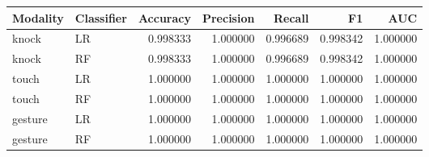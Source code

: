 \begin{tabular}{llrrrrr}
\toprule
Modality & Classifier & Accuracy & Precision & Recall & F1 & AUC \\
\midrule
knock & LR & 0.998333 & 1.000000 & 0.996689 & 0.998342 & 1.000000 \\
knock & RF & 0.998333 & 1.000000 & 0.996689 & 0.998342 & 1.000000 \\
touch & LR & 1.000000 & 1.000000 & 1.000000 & 1.000000 & 1.000000 \\
touch & RF & 1.000000 & 1.000000 & 1.000000 & 1.000000 & 1.000000 \\
gesture & LR & 1.000000 & 1.000000 & 1.000000 & 1.000000 & 1.000000 \\
gesture & RF & 1.000000 & 1.000000 & 1.000000 & 1.000000 & 1.000000 \\
\bottomrule
\end{tabular}
